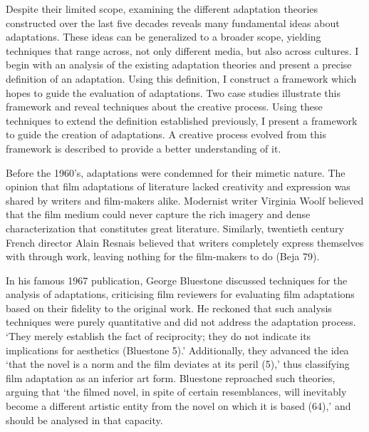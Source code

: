 \documentclass[12pt]{article}
\begin{document}
Despite their limited scope, examining the different adaptation theories 
constructed over the last five decades reveals many fundamental ideas about
adaptations. These ideas can be generalized to a broader scope,
yielding techniques that range across, not only different media, but also across cultures.
I begin with an analysis of the existing adaptation theories and present a
precise definition of an adaptation. Using this definition, I construct a
framework which hopes to guide the evaluation of adaptations. Two case studies
illustrate this framework and reveal techniques about the creative process.
Using these techniques to extend the definition established previously, I
present a framework to guide the creation of adaptations. A creative process
evolved from this framework is described to provide a better understanding of
it. 

Before the 1960's, adaptations were condemned for their mimetic nature. The
opinion that film adaptations of literature lacked creativity and expression
was shared by writers and film-makers alike. Modernist writer Virginia Woolf
believed that the film medium could never capture the rich imagery and dense
characterization that constitutes great literature. Similarly,
twentieth century French director Alain Resnais believed that writers completely express
themselves with through work, leaving nothing for the film-makers to do
(Beja 79).

In his famous 1967 publication, George Bluestone discussed techniques 
for the analysis of adaptations, criticising film reviewers for
evaluating film adaptations based on their fidelity to the original work. He
reckoned that such analysis techniques were purely quantitative and did not
address the adaptation process. `They merely establish the fact of reciprocity; they
do not indicate its implications for aesthetics (Bluestone 5).' Additionally, they
advanced the idea `that the novel is a norm and the film deviates at its peril
(5),' thus classifying film adaptation as an inferior art form. Bluestone 
reproached such theories, arguing that `the filmed novel, in spite
of certain resemblances, will inevitably become a different artistic entity
   from the novel on which it is based (64),' and should be analysed in that
   capacity.
\end{document}

